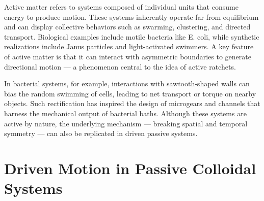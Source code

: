 Active matter refers to systems composed of individual units that consume energy to produce motion. These systems inherently operate far from equilibrium and can display collective behaviors such as swarming, clustering, and directed transport. Biological examples include motile bacteria like E. coli, while synthetic realizations include Janus particles and light-activated swimmers. A key feature of active matter is that it can interact with asymmetric boundaries to generate directional motion — a phenomenon central to the idea of active ratchets.

In bacterial systems, for example, interactions with sawtooth-shaped walls can bias the random swimming of cells, leading to net transport or torque on nearby objects. Such rectification has inspired the design of microgears and channels that harness the mechanical output of bacterial baths. Although these systems are active by nature, the underlying mechanism — breaking spatial and temporal symmetry — can also be replicated in driven passive systems.


\section{Driven Motion in Passive Colloidal Systems}




\newpage
